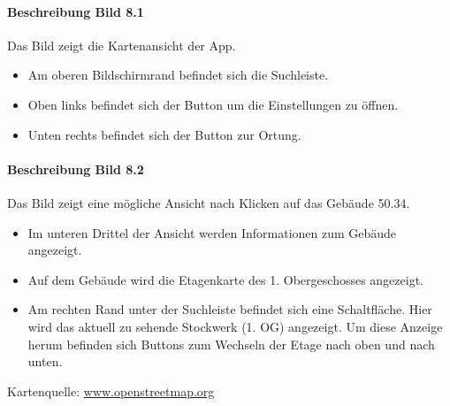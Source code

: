 \paragraph{Beschreibung Bild 8.1}
Das Bild zeigt die Kartenansicht der App.
\begin{itemize}
    \item Am oberen Bildschirmrand befindet sich die Suchleiste.
    \item Oben links befindet sich der Button um die Einstellungen zu öffnen.
    \item Unten rechts befindet sich der Button zur Ortung.
\end{itemize}
\paragraph{Beschreibung Bild 8.2}
Das Bild zeigt eine mögliche Ansicht nach Klicken auf das Gebäude 50.34.
\begin{itemize}
    \item Im unteren Drittel der Ansicht werden Informationen zum Gebäude angezeigt.
    \item Auf dem Gebäude wird die Etagenkarte des 1. Obergeschosses angezeigt.
    \item Am rechten Rand unter der Suchleiste befindet sich eine Schaltfläche. Hier wird das aktuell zu sehende Stockwerk (1. OG) angezeigt. Um diese Anzeige herum befinden sich Buttons zum Wechseln der Etage nach oben und nach unten.
\end{itemize}
Kartenquelle: \href{https://www.openstreetmap.org/}{www.openstreetmap.org}
